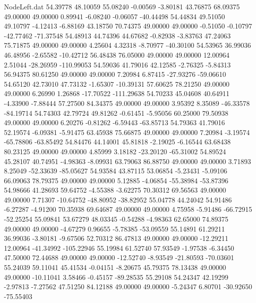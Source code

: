 \begin{filecontents}{NodeLeft.dat}
  54.39778   48.10059   55.08240    -0.00569   -3.80181   43.76875   68.09375   49.00000   49.00000    0.89941   -6.08240   -0.06057  -40.44498
  54.44834   49.51050   49.10797    -4.12413   -6.88169   43.18750   70.74375   49.00000   49.00000   -0.51050   -0.10797  -42.77462  -71.37548
  54.48913   44.74396   44.67682    -0.82938   -3.83763   47.24063   75.71875   49.00000   49.00000    4.25604    4.32318   -8.70977  -40.30100
  54.53965   36.99036   46.48956    -2.65582  -10.42712   56.48438   76.05000   49.00000   49.00000   12.00964    2.51044  -28.26959 -110.99053
  54.59036   41.79016   42.12585    -2.76325   -5.84313   56.94375   80.61250   49.00000   49.00000    7.20984    6.87415  -27.93276  -59.06610
  54.65120   42.73010   47.73132    -1.65307  -10.39131   57.60625   78.21250   49.00000   49.00000    6.26990    1.26868  -17.70522 -111.29638
  54.70233   45.04608   40.64911    -4.33900   -7.88444   57.27500   84.34375   49.00000   49.00000    3.95392    8.35089  -46.33578  -84.19714
  54.74303   42.79724   49.81262    -0.61451   -5.95056   60.25000   79.50938   49.00000   49.00000    6.20276   -0.81262   -6.59443  -63.85713
  54.79363   41.79016   52.19574    -6.09381   -5.91475   63.45938   75.66875   49.00000   49.00000    7.20984   -3.19574  -65.78806  -63.85492
  54.84476   44.14001   45.81818    -2.19025   -6.16544   63.68438   80.23125   49.00000   49.00000    4.85999    3.18182  -23.20120  -65.31002
  54.89524   45.28107   40.74951    -4.98363   -8.09931   63.79063   86.88750   49.00000   49.00000    3.71893    8.25049  -52.33639  -85.05627
  54.93584   43.87115   53.06854    -5.23431   -5.09106   66.09063   78.79375   49.00000   49.00000    5.12885   -4.06854  -55.38984  -53.87396
  54.98666   41.28693   59.64752    -4.55388   -3.62275   70.30312   69.56563   49.00000   49.00000    7.71307  -10.64752  -48.80952  -38.82952
  55.04778   44.24042   54.91486    -6.27287   -4.91200   70.35938   69.64687   49.00000   49.00000    4.75958   -5.91486  -66.72915  -52.25254
  55.09841   53.67279   48.03345    -0.54288   -4.98363   62.65000   74.89375   49.00000   49.00000   -4.67279    0.96655   -5.78385  -53.09559
  55.14891   61.29211   36.99036    -3.80181   -9.67506   52.70312   86.47813   49.00000   49.00000  -12.29211   12.00964  -41.34992 -105.22946
  55.19984   61.52740   57.93549    -1.97538   -6.34450   47.50000   72.44688   49.00000   49.00000  -12.52740   -8.93549  -21.80593  -70.03601
  55.24039   59.11041   45.41534    -0.04151   -8.20675   45.79375   78.13438   49.00000   49.00000  -10.11041    3.58466   -0.45157  -89.28535
  55.29108   54.24347   42.19299    -2.97813   -7.27562   47.51250   84.12188   49.00000   49.00000   -5.24347    6.80701  -30.92650  -75.55403

\end{filecontents}

